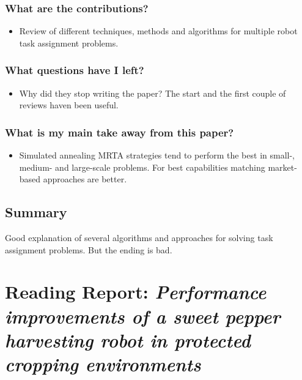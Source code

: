     \subsubsection*{What are the contributions?}
    \begin{itemize}
        \item Review of different techniques, methods and algorithms for multiple robot task assignment problems.
    \end{itemize}
    \subsubsection*{What questions have I left?}
    \begin{itemize}
        \item Why did they stop writing the paper? The start and the first couple of reviews haven been useful.
    \end{itemize}
    \subsubsection*{What is my main take away from this paper?}
    \begin{itemize}
        \item Simulated annealing MRTA strategies tend to perform the best in small-, medium- and large-scale problems. For best capabilities matching market-based approaches are better.
    \end{itemize}
    
    \subsection*{Summary}
    Good explanation of several algorithms and approaches for solving task assignment problems. But the ending is bad.

    
    \newpage
    \section{Reading Report: \emph{Performance improvements of a sweet pepper harvesting robot in protected cropping environments}}
    \label{sec:Lehnert2020}
    \cite{Lehnert2020}
    

